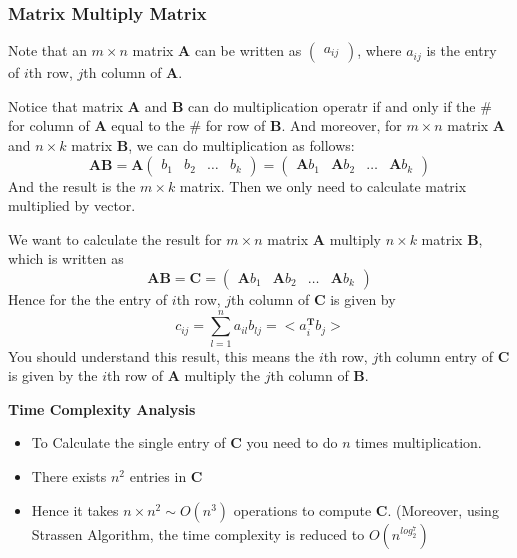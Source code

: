 \subsubsection{Matrix Multiply Matrix}
\begin{remark}
Note that an $m\times n$ matrix $\bm A$ can be written as $\begin{pmatrix}
a_{ij}
\end{pmatrix}$, where $a_{ij}$ is the entry of $i$th row, $j$th column of $\bm A $.\end{remark}



Notice that matrix $\bm A$ and $\bm B$ can do multiplication operatr if and only if the \# for column of $\bm A$ equal to the \# for row of $\bm B$. And moreover, for $m \times n$ matrix $\bm A$ and $n\times k$ matrix $\bm B$, we can do multiplication as follows:
\[
\bm A\bm B = \bm A \begin{pmatrix}
b_1 &b_2 & \dots & b_k
\end{pmatrix} = \begin{pmatrix}
\bm Ab_1 &\bm Ab_2 & \dots & \bm Ab_k
\end{pmatrix}
\]
And the result is the $m\times k$ matrix. Then we only need to calculate matrix multiplied by vector.
\begin{example}
We want to calculate the result for $m \times n$ matrix $\bm A$ multiply $n\times k$ matrix $\bm B$, which is written as 
\[\bm A\bm B = \bm C = \begin{pmatrix}
\bm Ab_1 &\bm Ab_2 & \dots & \bm Ab_k
\end{pmatrix}\]
Hence for the the entry of $i$th row, $j$th column of $\bm C $ is given by
\[
c_{ij} = \sum_{l=1}^{n}a_{il}b_{lj} = <a_i^{\bm T}b_j>
\]
You should understand this result, this means the $i$th row, $j$th column entry of $\bm C $ is given by the $i$th row of $\bm A $ multiply the $j$th column of $\bm B $.
\end{example}
\begin{remark}
\textbf{Time Complexity Analysis}
\begin{itemize}
\item
To Calculate the single entry of $\bm C$ you need to do $n$ times multiplication.
\item There exists $n^2$ entries in $\bm C$
\item
Hence it takes $n \times n^2 \sim O(n^3)$ operations to compute $\bm C$. (Moreover, using Strassen Algorithm, the time complexity is reduced to $O(n^{log_2^7})$
\end{itemize}
\end{remark}

